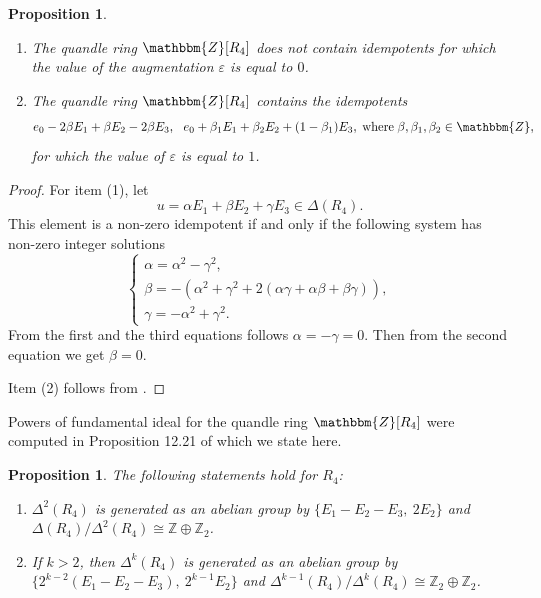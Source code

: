 \documentclass[12pt]{amsart}
\newtheorem{pro}[thm]{Proposition}
\theoremstyle{definition}
\theoremstyle{remark}
\def\a{\alpha}
\def\b{\beta}
\def\g{\gamma}
\begin{document}
\begin{pro} %

\begin{enumerate}
\item

The quandle ring  $\mathbbm {Z} [R_4]$ 
does not contain idempotents for which the value of the augmentation $\varepsilon$ is equal to $0$.

\item
 The quandle ring  $\mathbbm {Z} [R_4]$ 
contains the idempotents
$$
e_0 - 2 \beta  E_1 +  \beta  E_2 -  2 \beta  E_3,~~
e_0 +  \beta_1  E_1 +  \beta_2  E_2 + (1 - \beta_1)  E_3,\;  \text{where} \;  \beta, \beta_1,  \beta_2 \in \mathbbm {Z},
$$
for which the value of $\varepsilon$ is equal to $1$.
\end{enumerate}
\end{pro}

\begin{proof}
For item (1), let
$$
u = \a E_1 + \b E_2 + \g E_3 \in \Delta(R_4).
$$
This element is a non-zero  idempotent if and only if the following system has non-zero integer solutions
$$
\begin{cases}
\a = \a^2 - \g^2,\\
\b = -(\a^2 + \g^2 + 2 (\a \g + \a \b + \b \g)), \\
\g = -\a^2 + \g^2.
\end{cases}
$$
From the first and the third equations follows $\a = -\g = 0$. Then from the second equation  we get $\b =  0$. 


Item (2) follows from  \cite[Corollary 13.42]{BES}.
\end{proof}

 Powers of fundamental ideal for the quandle ring $\mathbbm {Z} [R_4]$  were computed in Proposition 12.21 of \cite{BES} which we state here.

\begin{pro}\label{ass-graded-2}
The following statements hold for $R_4$:
\begin{enumerate}
\item $\Delta^2(R_4)$ is generated as an abelian group by $\{E_1 - E_2 - E_3,~ 2 E_2\}$
and $\Delta(R_4) / \Delta^2(R_4) \cong \mathbb{Z} \oplus \mathbb{Z}_2$.
\item If $k > 2$, then $\Delta^k(R_4)$ is generated as an abelian group by $\{2^{k-2}(E_1 - E_2 - E_3), ~2^{k-1} E_2\}$
and $\Delta^{k-1}(R_4) / \Delta^k(R_4) \cong \mathbb{Z}_2 \oplus \mathbb{Z}_2$.
\end{enumerate}
\end{pro}
\end{document}
